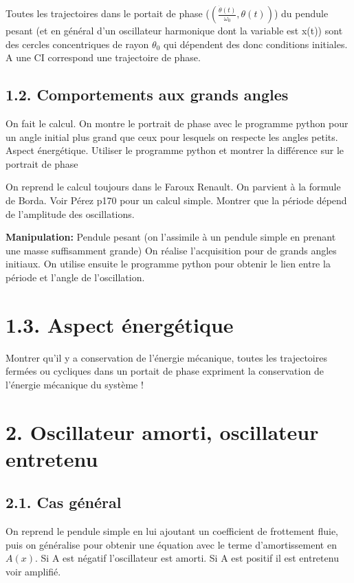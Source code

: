 \documentclass[french, a4paper, 10pt, twocolumn, landscape]{article}
\begin{document}
  Toutes les trajectoires dans le portait de phase ($(\frac{\dot{\theta}(t)}{\omega_0},\theta(t))$) du pendule pesant (et en général d'un oscillateur harmonique dont la variable est x(t)) sont des cercles concentriques de rayon $\theta_0$ qui dépendent des donc conditions initiales. A une CI correspond une trajectoire de phase.


\subsection*{1.2. Comportements aux grands angles }

On fait le calcul. On montre le portrait de phase avec le programme python pour un angle initial plus grand que ceux pour lesquels on respecte les angles petits. Aspect énergétique. Utiliser le programme python et montrer la différence sur le portrait de phase

On reprend le calcul toujours dans le Faroux Renault. On parvient à la formule de Borda. Voir Pérez p170 pour un calcul simple. Montrer que la période dépend de l'amplitude des oscillations.

\textbf{Manipulation:} Pendule pesant (on l'assimile à un pendule simple en prenant une masse suffisamment grande) On réalise l'acquisition pour de grands angles initiaux. On utilise ensuite le programme python pour obtenir le lien entre la période et l'angle de l'oscillation.

\section*{1.3. Aspect énergétique}

Montrer qu'il y a conservation de l'énergie mécanique, toutes les trajectoires fermées ou cycliques dans un portait de phase expriment la conservation de l'énergie mécanique du système !\\

\section*{2. Oscillateur amorti, oscillateur entretenu}

\subsection*{2.1. Cas général}

On reprend le pendule simple en lui ajoutant un coefficient de frottement fluie, puis on généralise pour obtenir une équation avec le terme d'amortissement en $A(x)$. Si A est négatif l'oscillateur est amorti. Si A est positif il est entretenu voir amplifié. 
\end{document}
